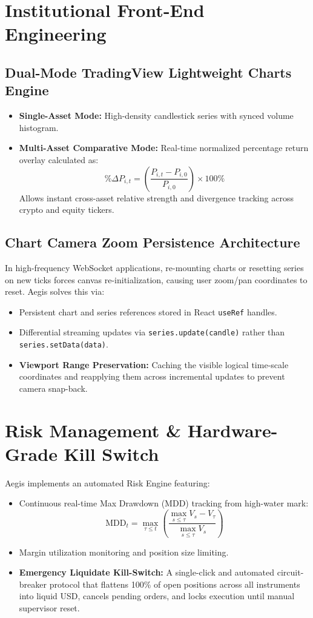 \documentclass[11pt,a4paper]{article}
\begin{document}
\section{Institutional Front-End Engineering}

\subsection{Dual-Mode TradingView Lightweight Charts Engine}
\begin{itemize}[leftmargin=1.5em]
  \item \textbf{Single-Asset Mode:} High-density candlestick series with synced volume histogram.
  \item \textbf{Multi-Asset Comparative Mode:} Real-time normalized percentage return overlay calculated as:
  $$\% \Delta P_{i, t} = \left( \frac{P_{i, t} - P_{i, 0}}{P_{i, 0}} \right) \times 100\%$$
  Allows instant cross-asset relative strength and divergence tracking across crypto and equity tickers.
\end{itemize}

\subsection{Chart Camera Zoom Persistence Architecture}
In high-frequency WebSocket applications, re-mounting charts or resetting series on new ticks forces canvas re-initialization, causing user zoom/pan coordinates to reset. Aegis solves this via:
\begin{itemize}[leftmargin=1.5em]
  \item Persistent chart and series references stored in React \texttt{useRef} handles.
  \item Differential streaming updates via \texttt{series.update(candle)} rather than \texttt{series.setData(data)}.
  \item \textbf{Viewport Range Preservation:} Caching the visible logical time-scale coordinates and reapplying them across incremental updates to prevent camera snap-back.
\end{itemize}

\section{Risk Management \& Hardware-Grade Kill Switch}

Aegis implements an automated Risk Engine featuring:
\begin{itemize}[leftmargin=1.5em]
  \item Continuous real-time Max Drawdown (MDD) tracking from high-water mark:
  $$\text{MDD}_t = \max_{\tau \le t} \left( \frac{\max_{s \le \tau} V_s - V_\tau}{\max_{s \le \tau} V_s} \right)$$
  \item Margin utilization monitoring and position size limiting.
  \item \textbf{Emergency Liquidate Kill-Switch:} A single-click and automated circuit-breaker protocol that flattens 100\% of open positions across all instruments into liquid USD, cancels pending orders, and locks execution until manual supervisor reset.
\end{itemize}
\end{document}

